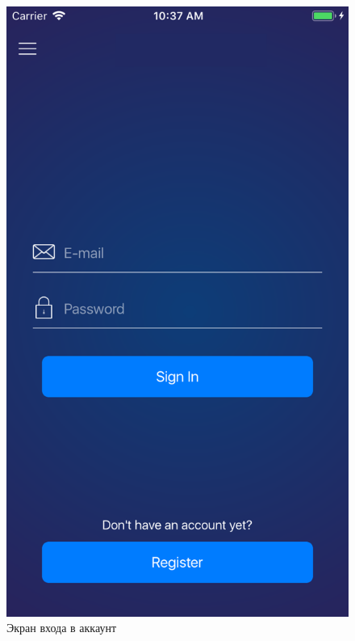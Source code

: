 ~
\begin{figure}[H]
\centering
	\includegraphics[scale=0.2]{figures/userGuide/signIn.png}
	\caption{Экран входа в аккаунт}
	\label{fig:develop:userGuide:signIn}
\end{figure}

